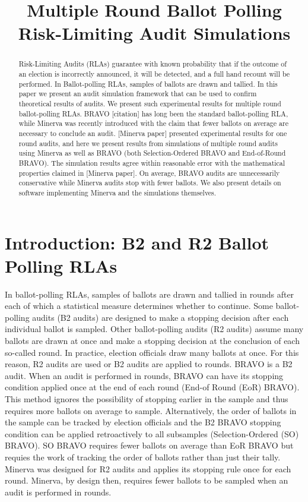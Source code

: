 \documentclass{article}
\title{Multiple Round Ballot Polling Risk-Limiting Audit Simulations}
\author{ }
\date{ }
\begin{document}
\maketitle

\begin{abstract}
    Risk-Limiting Audits (RLAs) guarantee with known probability 
    that if the outcome of an 
    election is incorrectly announced, it will be detected, 
    and a full hand recount will be performed. 
    In Ballot-polling RLAs, samples of ballots are drawn and tallied.
    In this paper we present an audit simulation framework
    that can be used to confirm theoretical results of audits.
    We present such experimental results for multiple round 
    ballot-polling RLAs.
    BRAVO [citation] has long been the standard ballot-polling RLA,
    while Minerva was recently introduced with the claim
    that fewer ballots on average are necessary to conclude 
    an audit.
    [Minerva paper] presented experimental
    results for one round audits, and here
    we present results
    from simulations of multiple round audits using Minerva 
    as well as BRAVO 
    (both Selection-Ordered 
    BRAVO and End-of-Round BRAVO).
    The simulation results agree within reasonable error with
    the mathematical properties claimed in [Minerva paper].
    On average, BRAVO audits are unnecessarily conservative 
    while Minerva audits stop with fewer ballots. We also
    present details on software implementing Minerva and
    the simulations themselves.
\end{abstract}

\section{Introduction: B2 and R2 Ballot Polling RLAs}
In ballot-polling RLAs, samples of ballots are drawn and tallied
in rounds
after each of which a statistical measure determines whether to
continue. 
Some ballot-polling audits (B2 audits) 
are designed to make a stopping decision
after each individual ballot is sampled.
Other ballot-polling audits (R2 audits) assume many ballots are drawn
at once and make a stopping decision at the conclusion of each 
so-called round.
In practice, election officials draw many ballots at once.
For this reason, R2 audits are used or B2 audits are applied to 
rounds.
BRAVO is a B2 audit. 
When an audit is performed in rounds, BRAVO can have its
stopping condition applied once at the end of each round
(End-of Round (EoR) BRAVO).
This method ignores the possibility of stopping earlier in the 
sample and thus requires more ballots on average to sample.
Alternatively, the order of ballots in the sample can be tracked
by election officials and the B2 BRAVO stopping condition can 
be applied retroactively to all subsamples 
(Selection-Ordered (SO) BRAVO).
SO BRAVO requires fewer ballots on average than EoR BRAVO but
requies the work of tracking the order of ballots rather than
just their tally.
Minerva was designed for R2 audits and applies its stopping rule
once for each round.
Minerva, by design then, requires fewer ballots to be sampled when 
an audit is performed in rounds.
 
\end{document}

